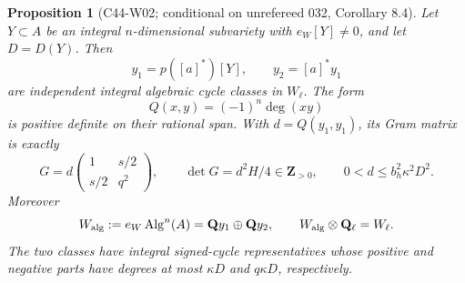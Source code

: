\documentclass[11pt]{article}
\newtheorem{proposition}[theorem]{Proposition}
\theoremstyle{remark}\newtheorem{remark}[theorem]{Remark}
\begin{document}
\begin{proposition}[C44-W02; conditional on unrefereed 032, Corollary 8.4]
Let $Y\subset A$ be an integral $n$-dimensional subvariety with
$e_W[Y]\ne0$, and let $D=D(Y)$.  Then
\[
 y_1=p([a]^*)[Y],\qquad y_2=[a]^*y_1
\]
are independent integral algebraic cycle classes in $W_\ell$.
The form
\[
 Q(x,y)=(-1)^n\deg(xy)
\]
is positive definite on their rational span.  With $d=Q(y_1,y_1)$,
its Gram matrix is exactly
\begin{equation}\label{c44:weil-gram}
 G=d\begin{pmatrix}1&s/2\\s/2&q^2\end{pmatrix},\qquad
 \det G=d^2H/4\in\mathbf Z_{>0},\qquad
 0<d\leq b_h^2\kappa^2D^2.
\end{equation}
Moreover
\[
 W_{\rm alg}:=e_W\operatorname{Alg}^n(A)
    =\mathbf Qy_1\oplus\mathbf Qy_2,
 \qquad W_{\rm alg}\otimes\mathbf Q_\ell=W_\ell.
\]
The two classes have integral signed-cycle representatives whose
positive and negative parts have degrees at most $\kappa D$ and
$q\kappa D$, respectively.
\end{proposition}
\end{document}
